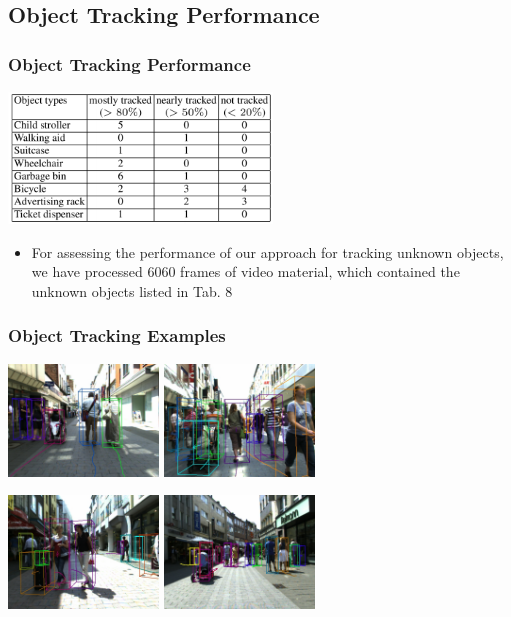 \documentclass{beamer}
\begin{document}
\subsection{Object Tracking Performance}
\begin{frame}
\frametitle{Object Tracking Performance} 
\begin{center}
	\includegraphics[width=7cm]{table.pdf}
\end{center}
\begin{itemize}
	\item For assessing the performance of our approach for
tracking unknown objects, we have processed 6060 frames of video material, which
contained the unknown objects listed in Tab. 8
\end{itemize}
\end{frame}

\begin{frame}
\frametitle{Object Tracking Examples} 
\begin{center}
  	\includegraphics[width=4cm]{objects1.jpg} \hspace{0.5cm}
  	\includegraphics[width=4cm]{objects2.jpg}
\end{center}
\begin{center}
  	\includegraphics[width=4cm]{objects3.jpg} \hspace{0.5cm}
  	\includegraphics[width=4cm]{objects4.jpg}
\end{center}

\end{frame} 
\end{document}
